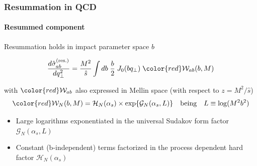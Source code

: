 \documentclass[aspectratio=43]{beamer}
\begin{document}
\begin{frame}

	\frametitle{Resummation in QCD}
	\framesubtitle{Resummed component}
	
	\footnotesize
	
	Resummation holds in impact parameter space $b$
	
	\begin{equation}
		\frac{d\hat{\sigma}_{ab}^{\textrm{(res.)}}}{dq_{\perp}^{2}} = \frac{M^{2}}{\hat{s}} \int db \; \frac{b}{2} \; J_{0}(b q_{\perp}) \; {\color{red} \mathcal{W}_{ab}(b, M)} \nonumber
	\end{equation}
	 
	with ${\color{red}\mathcal{W}_{ab}}$ also expressed in Mellin space (with respect to $z = M^{2}/\hat{s}$)
	\begin{equation}
		{\color{red} \mathcal{W}_{N}(b, M) = \mathcal{H}_{N}(\alpha_{s}) \times \exp\{\mathcal{G}_{N}(\alpha_{s}, L)\}} \quad\textrm{being}\quad L \equiv \log(M^{2}b^{2}) \nonumber
	\end{equation}

	\begin{itemize}
		\item Large logarithms exponentiated in the universal Sudakov form factor {\color{red}$\mathcal{G}_{N}(\alpha_{s}, L)$}
		\item Constant (b-independent) terms factorized in the process dependent hard factor {\color{red}$\mathcal{H}_{N}(\alpha_{s})$}
	\end{itemize}
	
\end{frame}
\end{document}
